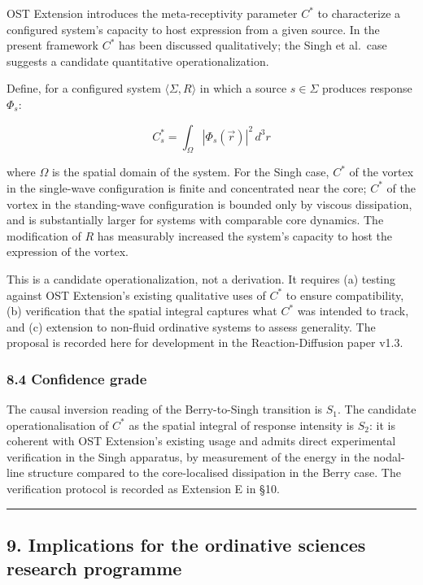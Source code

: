 \documentclass[
  11pt,
  a4paper,
]{article}
\begin{document}
OST Extension introduces the meta-receptivity parameter \(C^*\) to
characterize a configured system's capacity to host expression from a
given source. In the present framework \(C^*\) has been discussed
qualitatively; the Singh et al.~case suggests a candidate quantitative
operationalization.

Define, for a configured system \(\langle \Sigma, R \rangle\) in which a
source \(s \in \Sigma\) produces response \(\Phi_s\):

\[ C^*_s = \int_\Omega |\Phi_s(\vec r)|^2 \, d^3 r \tag{8.1} \]

where \(\Omega\) is the spatial domain of the system. For the Singh
case, \(C^*\) of the vortex in the single-wave configuration is finite
and concentrated near the core; \(C^*\) of the vortex in the
standing-wave configuration is bounded only by viscous dissipation, and
is substantially larger for systems with comparable core dynamics. The
modification of \(R\) has measurably increased the system's capacity to
host the expression of the vortex.

This is a candidate operationalization, not a derivation. It requires
(a) testing against OST Extension's existing qualitative uses of \(C^*\)
to ensure compatibility, (b) verification that the spatial integral
captures what \(C^*\) was intended to track, and (c) extension to
non-fluid ordinative systems to assess generality. The proposal is
recorded here for development in the Reaction-Diffusion paper v1.3.

\subsubsection{8.4 Confidence grade}\label{confidence-grade-4}

The causal inversion reading of the Berry-to-Singh transition is
\(S_1\). The candidate operationalisation of \(C^*\) as the spatial
integral of response intensity is \(S_2\): it is coherent with OST
Extension's existing usage and admits direct experimental verification
in the Singh apparatus, by measurement of the energy in the nodal-line
structure compared to the core-localised dissipation in the Berry case.
The verification protocol is recorded as Extension E in §10.

\begin{center}\rule{0.5\linewidth}{0.5pt}\end{center}

\subsection{9. Implications for the ordinative sciences research
programme}\label{implications-for-the-ordinative-sciences-research-programme}
\end{document}
